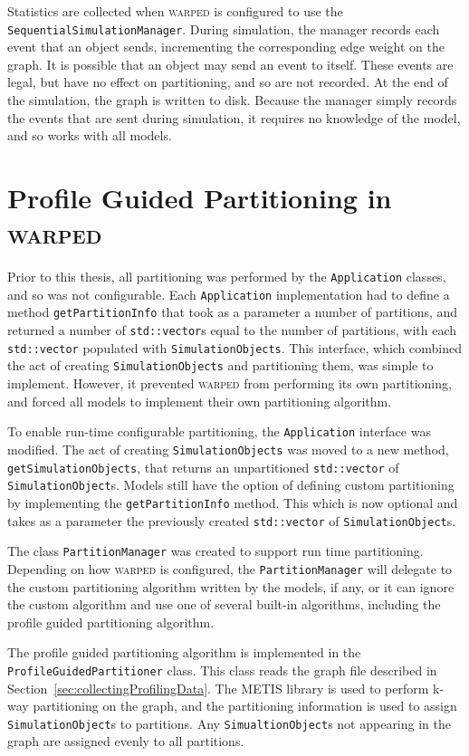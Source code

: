 \documentclass[11pt]{book}
\begin{document}
Statistics are collected when \textsc{warped} is configured to use the \texttt{SequentialSimulationManager}. During simulation, the manager records each event that an object sends, incrementing the corresponding edge weight on the graph. It is possible that an object may send an event to itself. These events are legal, but have no effect on partitioning, and so are not recorded. At the end of the simulation, the graph is written to disk. Because the manager simply records the events that are sent during simulation, it requires no knowledge of the model, and so works with all models.


\section{Profile Guided Partitioning in \textsc{warped}}

Prior to this thesis, all partitioning was performed by the \texttt{Application} classes, and so was not configurable. Each \texttt{Application} implementation had to define a method \texttt{getPartitionInfo} that took as a parameter a number of partitions, and returned a number of \texttt{std::vector}s equal to the number of partitions, with each \texttt{std::vector} populated with \texttt{SimulationObjects}. This interface, which combined the act of creating \texttt{SimulationObjects} and partitioning them, was simple to implement. However, it prevented \textsc{warped} from performing its own partitioning, and forced all models to implement their own partitioning algorithm.

To enable run-time configurable partitioning, the \texttt{Application} interface was modified. The act of creating \texttt{SimulationObjects} was moved to a new method, \texttt{getSimulationObjects}, that returns an unpartitioned \texttt{std::vector} of \texttt{SimulationObject}s. Models still have the option of defining custom partitioning by implementing the \texttt{getPartitionInfo} method. This which is now optional and takes as a parameter the previously created \texttt{std::vector} of \texttt{SimulationObject}s.

The class \texttt{PartitionManager} was created to support run time partitioning. Depending on how \textsc{warped} is configured, the \texttt{PartitionManager} will delegate to the custom partitioning algorithm written by the models, if any, or it can ignore the custom algorithm and use one of several built-in algorithms, including the profile guided partitioning algorithm.

The profile guided partitioning algorithm is implemented in the \texttt{ProfileGuidedPartitioner} class. This class reads the graph file described in Section~\ref{sec:collectingProfilingData}. The METIS library is used to perform k-way partitioning on the graph, and the partitioning information is used to assign \texttt{SimulationObject}s to partitions. Any \texttt{SimualtionObject}s not appearing in the graph are assigned evenly to all partitions.
\end{document}
